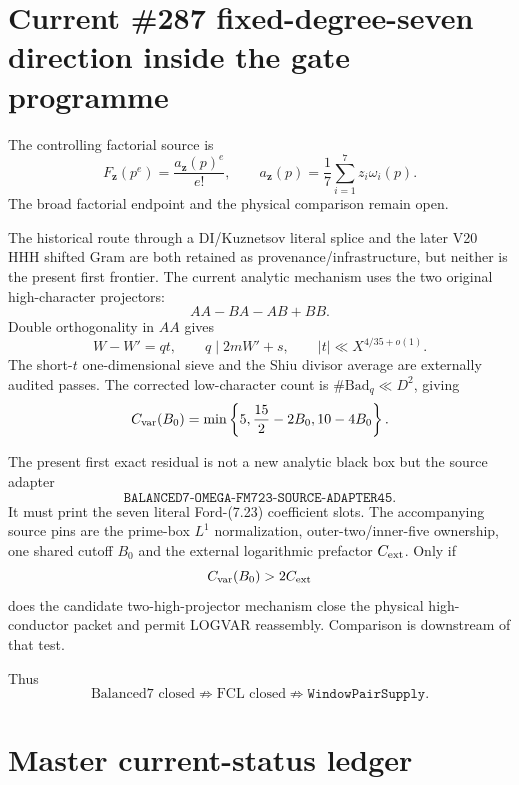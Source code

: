 \documentclass[11pt]{article}
\theoremstyle{definition}
\newcommand{\1}{\mathbf 1}
\begin{document}
\section{Current \#287 fixed-degree-seven direction inside the gate programme}
\label{sec:fixed-degree-seven-ledger}

The controlling factorial source is
\[
F_{\mathbf z}(p^e)=\frac{a_{\mathbf z}(p)^e}{e!},
\qquad
a_{\mathbf z}(p)=\frac17\sum_{i=1}^{7}z_i\omega_i(p).
\]
The broad factorial endpoint and the physical comparison remain open.

The historical route through a DI/Kuznetsov literal splice and the later V20 HHH shifted
Gram are both retained as provenance/infrastructure, but neither is the present first
frontier.  The current analytic mechanism uses the two original high-character projectors:
\[
AA-BA-AB+BB.
\]
Double orthogonality in $AA$ gives
\[
W-W'=qt,\qquad q\mid2mW'+s,\qquad |t|\ll X^{4/35+o(1)}.
\]
The short-$t$ one-dimensional sieve and the Shiu divisor average are externally audited
passes.  The corrected low-character count is $\#\mathrm{Bad}_q\ll D^2$, giving
\[
C_{\rm var}(B_0)=
\min\left\{5,\frac{15}{2}-2B_0,10-4B_0\right\}.
\]

The present first exact residual is not a new analytic black box but the source adapter
\[
\boxed{\texttt{BALANCED7-OMEGA-FM723-SOURCE-ADAPTER45}.}
\]
It must print the seven literal Ford-(7.23) coefficient slots.  The accompanying source
pins are the prime-box $L^1$ normalization, outer-two/inner-five ownership, one shared
cutoff $B_0$ and the external logarithmic prefactor $C_{\rm ext}$.  Only if
\[
C_{\rm var}(B_0)>2C_{\rm ext}
\]
does the candidate two-high-projector mechanism close the physical high-conductor packet
and permit LOGVAR reassembly.  Comparison is downstream of that test.

Thus
\[
\boxed{
\text{Balanced7 closed}
\not\Longrightarrow
\text{FCL closed}
\not\Longrightarrow
\texttt{WindowPairSupply}.
}
\]


\section{Master current-status ledger}
\label{sec:master-ledger}
\end{document}
